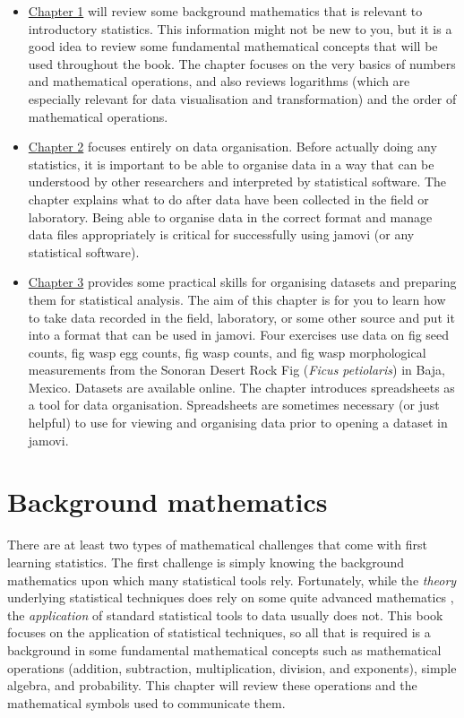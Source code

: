 \documentclass[
  openany]{scrbook}
\begin{document}
\begin{itemize}
\item
  \protect\hyperlink{Chapter_1}{Chapter 1} will review some background mathematics that is relevant to introductory statistics.
  This information might not be new to you, but it is a good idea to review some fundamental mathematical concepts that will be used throughout the book.
  The chapter focuses on the very basics of numbers and mathematical operations, and also reviews logarithms (which are especially relevant for data visualisation and transformation) and the order of mathematical operations.
\item
  \protect\hyperlink{Chapter_2}{Chapter 2} focuses entirely on data organisation.
  Before actually doing any statistics, it is important to be able to organise data in a way that can be understood by other researchers and interpreted by statistical software.
  The chapter explains what to do after data have been collected in the field or laboratory.
  Being able to organise data in the correct format and manage data files appropriately is critical for successfully using jamovi (or any statistical software).
\item
  \protect\hyperlink{Chapter_3}{Chapter 3} provides some practical skills for organising datasets and preparing them for statistical analysis.
  The aim of this chapter is for you to learn how to take data recorded in the field, laboratory, or some other source and put it into a format that can be used in jamovi.
  Four exercises use data on fig seed counts, fig wasp egg counts, fig wasp counts, and fig wasp morphological measurements from the Sonoran Desert Rock Fig (\emph{Ficus petiolaris}) in Baja, Mexico.
  Datasets are available online.
  The chapter introduces spreadsheets as a tool for data organisation.
  Spreadsheets are sometimes necessary (or just helpful) to use for viewing and organising data prior to opening a dataset in jamovi.
\end{itemize}

\hypertarget{Chapter_1}{%
\chapter{Background mathematics}\label{Chapter_1}}

There are at least two types of mathematical challenges that come with first learning statistics.
The first challenge is simply knowing the background mathematics upon which many statistical tools rely.
Fortunately, while the \emph{theory} underlying statistical techniques does rely on some quite advanced mathematics \citep[e.g., see][]{Mclean1991, Rencher2000, Miller2004}, the \emph{application} of standard statistical tools to data usually does not.
This book focuses on the application of statistical techniques, so all that is required is a background in some fundamental mathematical concepts such as mathematical operations (addition, subtraction, multiplication, division, and exponents), simple algebra, and probability.
This chapter will review these operations and the mathematical symbols used to communicate them.
\end{document}
